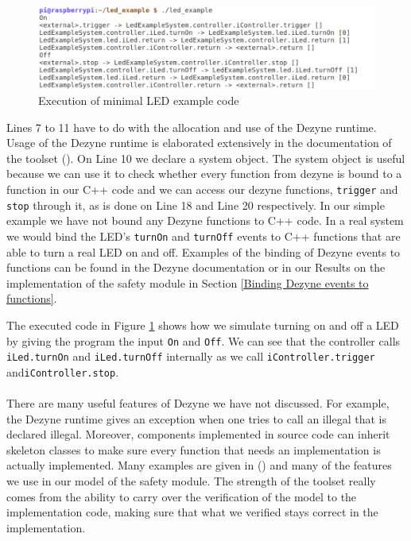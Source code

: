 \documentclass[12pt]{scrreprt}
\begin{document}
\begin{appendices}
\begin{figure}[H]
    \centering
    \includegraphics[width=\textwidth]{Figures/theoretical_background/executed.png}
    \caption{Execution of minimal LED example code}
    \label{Execution of minimal led example code}
\end{figure}

Lines 7 to 11 have to do with the allocation and use of the Dezyne runtime. Usage of the Dezyne runtime is elaborated extensively in the documentation of the toolset (\cite{dzndoc}). On Line 10 we declare a system object. The system object is useful because we can use it to check whether every function from dezyne is bound to a function in our C++ code and we can access our dezyne functions, \texttt{trigger} and \texttt{stop} through it, as is done on Line 18 and Line 20 respectively. In our simple example we have not bound any Dezyne functions to C++ code. In a real system we would bind the LED's \texttt{turnOn} and \texttt{turnOff} events to C++ functions that are able to turn a real LED on and off. Examples of the binding of Dezyne events to functions can be found in the Dezyne documentation or in our Results on the implementation of the safety module in Section \ref{Binding Dezyne events to functions}. 
\par
The executed code in Figure \ref{Execution of minimal led example code} shows how we simulate turning on and off a LED by giving the program the input \texttt{On} and \texttt{Off}. We can see that the controller calls \texttt{iLed.turnOn} and \texttt{iLed.turnOff} internally as we call \texttt{iController.trigger} and\newline\texttt{iController.stop}.
\\\\
There are many useful features of Dezyne we have not discussed. For example, the Dezyne runtime gives an exception when one tries to call an illegal that is declared illegal. Moreover, components implemented in source code can inherit skeleton classes to make sure every function that needs an implementation is actually implemented. Many examples are given in (\cite{dzntut}) and many of the features we use in our model of the safety module. The strength of the toolset really comes from the ability to carry over the verification of the model to the implementation code, making sure that what we verified stays correct in the implementation.



\end{appendices}
\end{document}
